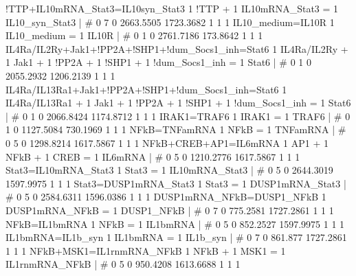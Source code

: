 !TTP+IL10mRNA_Stat3=IL10syn_Stat3                   	1 !TTP + 1 IL10mRNA_Stat3 = 1 IL10_syn_Stat3 	| 	# 	0              7              0      2663.5505      1723.3682              1              1              1 
IL10_medium=IL10R                                   	1 IL10_medium = 1 IL10R 	| 	# 	0              1              0      2761.7186       173.8642              1              1              1 
IL4Ra/IL2Ry+Jak1+!PP2A+!SHP1+!dum_Socs1_inh=Stat6   	1 IL4Ra/IL2Ry + 1 Jak1 + 1 !PP2A + 1 !SHP1 + 1 !dum_Socs1_inh = 1 Stat6 	| 	# 	0              1              0      2055.2932      1206.2139              1              1              1 
IL4Ra/IL13Ra1+Jak1+!PP2A+!SHP1+!dum_Socs1_inh=Stat6 	1 IL4Ra/IL13Ra1 + 1 Jak1 + 1 !PP2A + 1 !SHP1 + 1 !dum_Socs1_inh = 1 Stat6 	| 	# 	0              1              0      2066.8424      1174.8712              1              1              1 
IRAK1=TRAF6                                         	1 IRAK1 = 1 TRAF6 	| 	# 	0              1              0      1127.5084       730.1969              1              1              1 
NFkB=TNFamRNA                                       	1 NFkB = 1 TNFamRNA 	| 	# 	0              5              0      1298.8214      1617.5867              1              1              1 
NFkB+CREB+AP1=IL6mRNA                               	1 AP1 + 1 NFkB + 1 CREB = 1 IL6mRNA 	| 	# 	0              5              0      1210.2776      1617.5867              1              1              1 
Stat3=IL10mRNA_Stat3                                	1 Stat3 = 1 IL10mRNA_Stat3 	| 	# 	0              5              0      2644.3019      1597.9975              1              1              1 
Stat3=DUSP1mRNA_Stat3                               	1 Stat3 = 1 DUSP1mRNA_Stat3 	| 	# 	0              5              0      2584.6311      1596.0386              1              1              1 
DUSP1mRNA_NFkB=DUSP1_NFkB                           	1 DUSP1mRNA_NFkB = 1 DUSP1_NFkB 	| 	# 	0              7              0       775.2581      1727.2861              1              1              1 
NFkB=IL1bmRNA                                       	1 NFkB = 1 IL1bmRNA 	| 	# 	0              5              0       852.2527      1597.9975              1              1              1 
IL1bmRNA=IL1b_syn                                   	1 IL1bmRNA = 1 IL1b_syn 	| 	# 	0              7              0        861.877      1727.2861              1              1              1 
NFkB+MSK1=IL1rnmRNA_NFkB                            	1 NFkB + 1 MSK1 = 1 IL1rnmRNA_NFkB 	| 	# 	0              5              0       950.4208      1613.6688              1              1              1 
